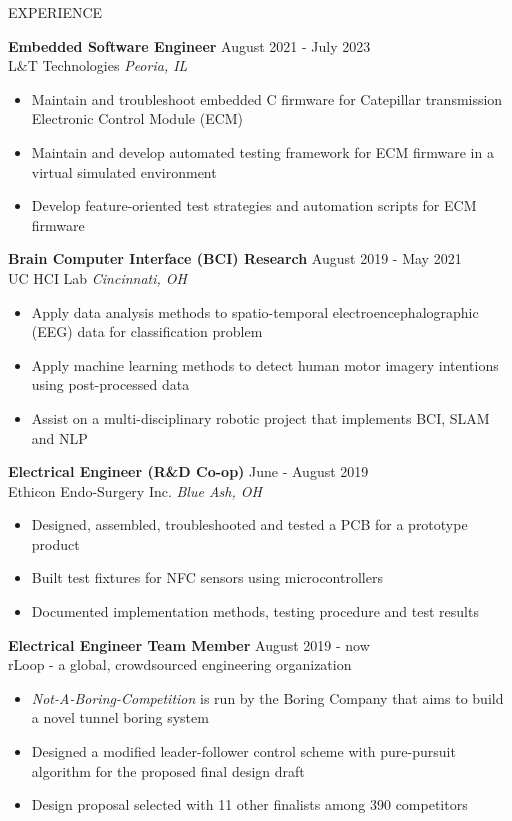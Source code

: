 \documentclass{lib/resume} %
\begin{document}
\begin{rSection}{EXPERIENCE}

    \textbf{Embedded Software Engineer} \hfill August 2021 - July 2023 \\
    L\&T Technologies \hfill \textit{Peoria, IL}
    \begin{itemize}
        \itemsep -4pt {}
        \item Maintain and troubleshoot embedded C firmware for Catepillar transmission Electronic Control Module (ECM)
        \item Maintain and develop automated testing framework for ECM firmware in a virtual simulated environment
        \item Develop feature-oriented test strategies and automation scripts for ECM firmware
    \end{itemize}

    \textbf{Brain Computer Interface (BCI) Research} \hfill August 2019 - May 2021 \\
    UC HCI Lab \hfill \textit{Cincinnati, OH}
    \begin{itemize}
        \itemsep -4pt {}
        \item Apply data analysis methods to spatio-temporal electroencephalographic (EEG) data for classification problem
        \item Apply machine learning methods to detect human motor imagery intentions using post-processed data
        \item Assist on a multi-disciplinary robotic project that implements BCI, SLAM and NLP
    \end{itemize}


    \textbf{Electrical Engineer (R\&D Co-op)} \hfill June - August 2019\\
    Ethicon Endo-Surgery Inc. \hfill \textit{Blue Ash, OH}
    \begin{itemize}
        \itemsep -4pt {}
        \item Designed, assembled, troubleshooted and tested a PCB for a prototype product
        \item Built test fixtures for NFC sensors using microcontrollers
        \item Documented implementation methods, testing procedure and test results
    \end{itemize}

    \textbf{Electrical Engineer Team Member} \hfill August 2019 - now
    \\	rLoop - a global, crowdsourced engineering organization \hfill \textit{}
    \begin{itemize}
        \itemsep -4pt {}
        \item \textit{Not-A-Boring-Competition} is run by the Boring Company that aims to build a novel tunnel boring system
        \item Designed a modified leader-follower control scheme with pure-pursuit algorithm for the proposed final design draft
        \item Design proposal selected with 11 other finalists among 390 competitors
    \end{itemize}




\end{rSection}
\end{document}

